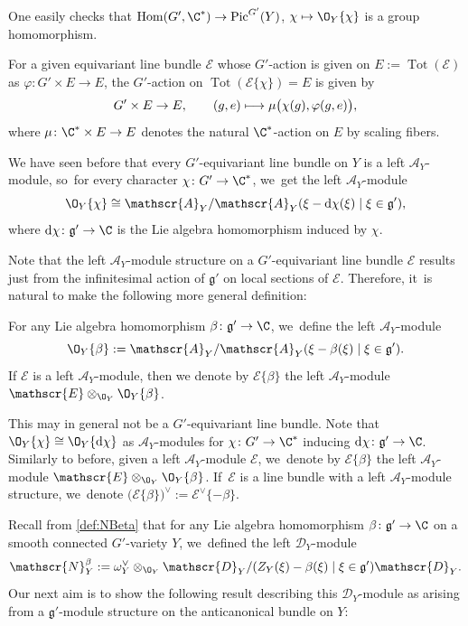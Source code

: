 \documentclass[JEP,XML,SOM,Unicode,published]{cedram}
\newcommand\mto{\mathchoice{\longmapsto}{\mapsto}{\mapsto}{\mapsto}}
\newcommand{\cA}{\mathscr{A}}
\newcommand{\frg}{\mathfrak{g}}
\DeclareMathOperator{\differential}{d\!}
\DeclareMathOperator{\Pic}{Pic}
\DeclareMathOperator{\Tot}{Tot}
\begin{document}
One easily checks that
$\operatorname{Hom}(G', \C^*) \to \Pic^{G'}(Y)$, $\chi \mto \O_Y\{\chi\}$ is a group homomorphism.

\begin{rmk}
For a given equivariant line bundle $\mathscr{E}$ whose $G'$-action is given on $E := \Tot(\mathscr{E})$ as $\varphi \colon G' \times E \to E$, the $G'$-action on $\Tot(\mathscr{E}\{\chi\}) = E$ is given by
\[
G' \times E \to E, \qquad (g,e) \mto \mu\big(\chi(g),\varphi(g,e)\big),
\]
where $\mu \colon \C^* \times E \to E$ denotes the natural $\C^*$-action on $E$ by scaling fibers.
\end{rmk}

We have seen before that every $G'$-equivariant line bundle on $Y$ is a left $\cA_Y$\nobreakdash-mod\-ule, so~for every character $\chi \colon G' \to \C^*$, we~get the left $\cA_Y$\nobreakdash-mod\-ule
\[
\O_Y\{\chi\} \cong \cA_Y/\cA_Y (\xi - \differential\chi(\xi) \mid \xi \in \frg'),
\]
where $\differential\chi \colon \frg' \to \C$ is the Lie algebra homomorphism induced by $\chi$.

Note that the left $\cA_Y$\nobreakdash-mod\-ule structure on a $G'$-equivariant line bundle $\mathscr{E}$ results just from the infinitesimal action of $\frg'$ on local sections of $\mathscr{E}$. Therefore, it~is natural to make the following more general definition:

\begin{dfn} For any Lie algebra homomorphism $\beta \colon \frg' \to \C$, we~define the left $\mathscr A_Y$\nobreakdash-mod\-ule
\[
\O_Y\{\beta\} := \cA_Y/\cA_Y (\xi - \beta(\xi) \mid \xi \in \frg').
\]
If $\mathscr E$ is a left $\cA_Y$\nobreakdash-mod\-ule, then we denote by $\mathscr E \{\beta\}$ the left $\cA_Y$\nobreakdash-mod\-ule $\mathscr{E} \otimes_{\O_Y} \O_Y\{\beta\}$.
\end{dfn}
This may in general not be a $G'$-equivariant line bundle. Note that $\O_Y\{\chi\} \cong \O_Y\{\differential \chi\}$ as $\cA_Y$\nobreakdash-mod\-ules for $\chi \colon G' \to \C^*$ inducing $\differential\chi \colon \frg' \to \C$. Similarly to before, given a left $\cA_Y$\nobreakdash-mod\-ule $\mathscr E$, we~denote by $\mathscr E \{\beta\}$ the left $\cA_Y$\nobreakdash-mod\-ule $\mathscr{E} \otimes_{\O_Y} \O_Y\{\beta\}$. If~$\mathscr E$ is a line bundle with a left $\cA_Y$\nobreakdash-mod\-ule structure, we~denote $\mathscr (\mathscr E\{\beta\})^\vee := \mathscr E^\vee\{-\beta\}$.

Recall from \cref{def:NBeta} that for any Lie algebra homomorphism $\beta \colon \frg' \to \C$ on a smooth connected $G'$-variety $Y$, we~defined the left $\mathscr{D}_Y$\nobreakdash-mod\-ule
\[
\mathscr{N}_{Y}^{\beta} := \omega_Y^\vee \otimes_{\O_Y} \mathscr{D}_Y / (Z_Y(\xi)-\beta(\xi) \mid \xi \in \frg') \mathscr{D}_Y.
\]
Our next aim is to show the following result describing this $\mathscr{D}_Y$\nobreakdash-mod\-ule as arising from a $\frg'$\nobreakdash-mod\-ule structure on the anticanonical bundle on $Y$:
\end{document}
